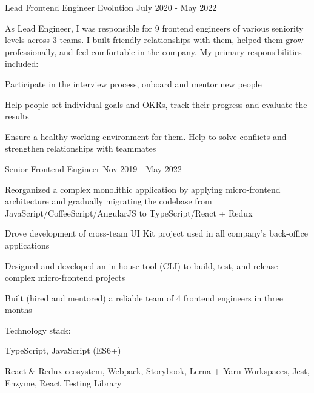 \begin{cventries}
  \cventry
    {Lead Frontend Engineer} %
    {Evolution} %
    {} %
    {July 2020 - May 2022} %
    {
      As Lead Engineer, I was responsible for 9 frontend engineers of various seniority levels across 3 teams. I built friendly relationships with them, helped them grow professionally, and feel comfortable in the company.
      \newline
      My primary responsibilities included:
      \vspace{4mm}
      \begin{cvitems}
        \item Participate in the interview process, onboard and mentor new people
        \item Help people set individual goals and OKRs, track their progress and evaluate the results
        \item Ensure a healthy working environment for them. Help to solve conflicts and strengthen relationships with teammates
      \end{cvitems}
    }

  \cventry
    {Senior Frontend Engineer} %
    {} %
    {} %
    {Nov 2019 - May 2022} %
    {
      \begin{cvitems} 
        \item Reorganized a complex monolithic application by applying micro-frontend architecture and gradually migrating the codebase from JavaScript/CoffeeScript/AngularJS to TypeScript/React + Redux
        \item Drove development of cross-team UI Kit project used in all company's back-office applications
        \item Designed and developed an in-house tool (CLI) to build, test, and release complex micro-frontend projects
        \item Built (hired and mentored) a reliable team of 4 frontend engineers in three months
      \end{cvitems}
      \vspace{5mm}
      Technology stack:
      \begin{cvstackitems}
        \item TypeScript, JavaScript (ES6+)
        \item React \& Redux ecosystem, Webpack, Storybook, Lerna + Yarn Workspaces, Jest, Enzyme, React Testing Library
      \end{cvstackitems}
      \vspace{-2.0mm}
    }


\end{cventries}

